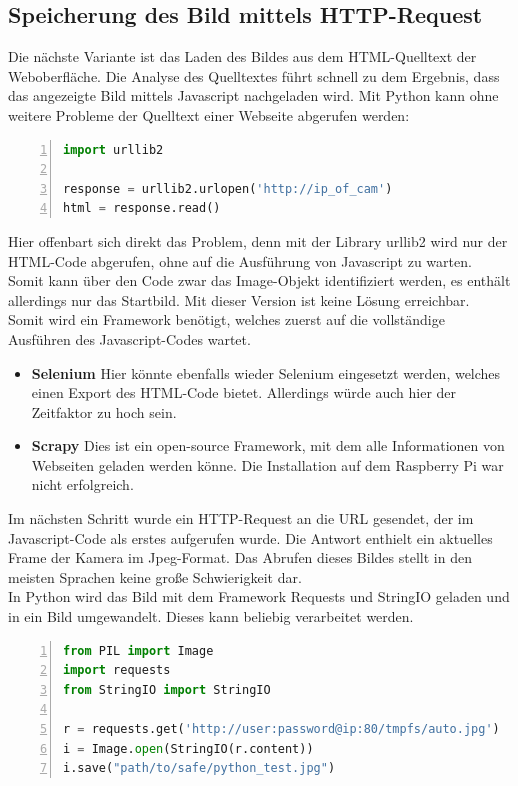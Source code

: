\subsection{Speicherung des Bild mittels HTTP-Request}

Die nächste Variante ist das Laden des Bildes aus dem HTML-Quelltext der Weboberfläche. Die Analyse des Quelltextes führt schnell zu dem Ergebnis, dass das angezeigte Bild mittels Javascript nachgeladen wird. Mit Python kann ohne weitere Probleme der Quelltext einer Webseite abgerufen werden: 
\begin{lstlisting}[caption = Testcode - Aufnahme Screenshot mit Selenium, language=python, frame=single, breaklines=true,columns=fullflexible, commentstyle=\color{gray}\upshape, captionpos=b, numbers = left]
import urllib2

response = urllib2.urlopen('http://ip_of_cam')
html = response.read()
\end{lstlisting}
Hier offenbart sich direkt das Problem, denn mit der Library urllib2 wird nur der HTML-Code abgerufen, ohne auf die Ausführung von Javascript zu warten. Somit kann über den Code zwar das Image-Objekt identifiziert werden, es enthält allerdings nur das Startbild. Mit dieser Version ist keine Lösung erreichbar. \\
Somit wird ein Framework benötigt, welches zuerst auf die vollständige Ausführen des Javascript-Codes wartet.
\begin{itemize}
	\item \textbf{Selenium}
	Hier könnte ebenfalls wieder Selenium eingesetzt werden, welches einen Export des HTML-Code bietet. Allerdings würde auch hier der Zeitfaktor zu hoch sein. 
	\item \textbf{Scrapy}
	Dies ist ein open-source Framework, mit dem alle Informationen von Webseiten geladen werden könne. Die Installation auf dem Raspberry Pi war nicht erfolgreich.
\end{itemize}
Im nächsten Schritt wurde ein HTTP-Request an die URL gesendet, der im Javascript-Code als erstes aufgerufen wurde. Die Antwort enthielt ein aktuelles Frame der Kamera im Jpeg-Format. Das Abrufen dieses Bildes stellt in den meisten Sprachen keine große Schwierigkeit dar. \\
In Python wird das Bild mit dem Framework Requests und StringIO geladen und in ein Bild umgewandelt. Dieses kann beliebig verarbeitet werden. 
\begin{lstlisting}[caption = Abrufen eines BIldes von einer URL in Python, language=python, frame=single, breaklines=true,columns=fullflexible, commentstyle=\color{gray}\upshape, captionpos=b, numbers = left]
from PIL import Image
import requests
from StringIO import StringIO

r = requests.get('http://user:password@ip:80/tmpfs/auto.jpg')
i = Image.open(StringIO(r.content))
i.save("path/to/safe/python_test.jpg")
\end{lstlisting}
